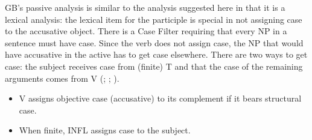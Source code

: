 GB's passive analysis is similar to the analysis suggested here in that it is a lexical analysis:
the lexical item for the participle is special in not assigning case to the accusative object. There
is a Case Filter requiring that every NP in a sentence must have case. Since the verb does not
assign case, the NP that would have accusative in the active has to get case elsewhere. There are two
ways to get case: the subject receives case from (finite) T and
that the case of the remaining arguments comes from V (\citealp[]{Chomsky81a}; \citealp[]{Haider84b}; \citealp[--73]{FF87a}).
\begin{principle-break}\label{Kasusprinzip-GB}
\begin{itemize}
\item V assigns objective case (accusative) to its complement if it bears structural case.
\item When finite, INFL assigns case to the subject.
\end{itemize}
\end{principle-break}


